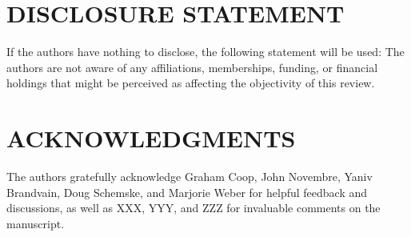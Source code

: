\documentclass{ar-1col}
\begin{document}
\section*{DISCLOSURE STATEMENT}
If the authors have nothing to disclose, the following statement will be used: 
The authors are not aware of any affiliations, memberships, funding, or financial holdings 
that might be perceived as affecting the objectivity of this review.

\section*{ACKNOWLEDGMENTS}
The authors gratefully acknowledge 
Graham Coop, John Novembre, 
Yaniv Brandvain, Doug Schemske, and Marjorie Weber 
for helpful feedback and discussions, 
as well as XXX, YYY, and ZZZ for invaluable comments on the manuscript.



\end{document}

